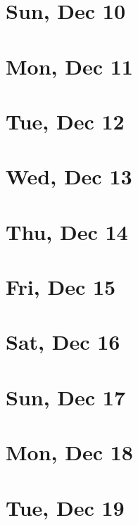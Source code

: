 	\section{Sun, Dec 10}
		
	\section{Mon, Dec 11}
		
	\section{Tue, Dec 12}
		
	\section{Wed, Dec 13}
		
	\section{Thu, Dec 14}
		
	\section{Fri, Dec 15}
		
	\section{Sat, Dec 16}
		
	\section{Sun, Dec 17}
		
	\section{Mon, Dec 18}
		
	\section{Tue, Dec 19}
		
